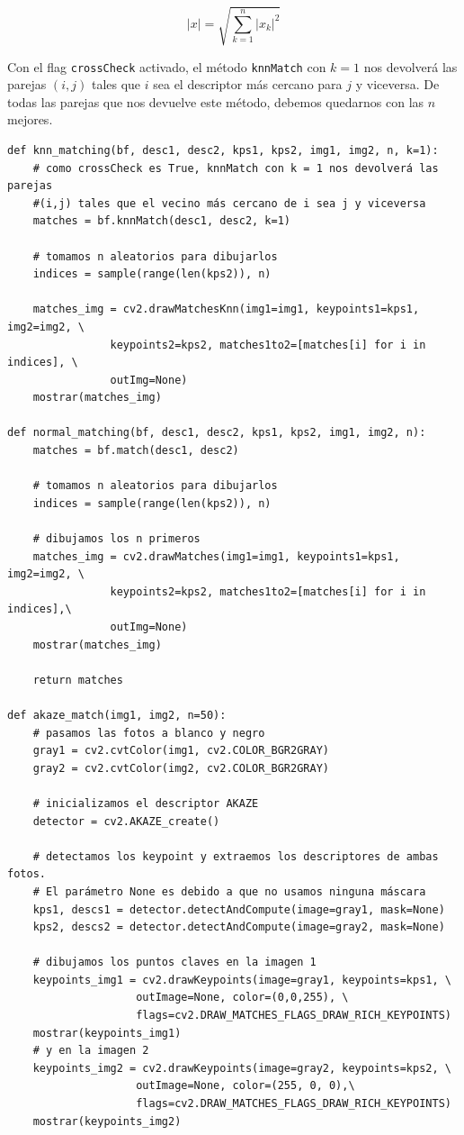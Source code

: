 \documentclass[11pt,a4paper]{article}
\theoremstyle{plain}
\theoremstyle{definition}
\begin{document}
\begin{displaymath}
 |x| = \sqrt{\sum_{k=1}^n |x_k|^2} 
\end{displaymath}

Con el flag \texttt{crossCheck} activado, el método \texttt{knnMatch} con $k=1$ nos devolverá las parejas $(i,j)$ tales que $i$ sea el descriptor más cercano para $j$ y viceversa. De todas las parejas que nos devuelve este método, debemos quedarnos con las $n$ mejores.

\begin{verbatim}
def knn_matching(bf, desc1, desc2, kps1, kps2, img1, img2, n, k=1):
    # como crossCheck es True, knnMatch con k = 1 nos devolverá las parejas 
    #(i,j) tales que el vecino más cercano de i sea j y viceversa
    matches = bf.knnMatch(desc1, desc2, k=1)

    # tomamos n aleatorios para dibujarlos
    indices = sample(range(len(kps2)), n)

    matches_img = cv2.drawMatchesKnn(img1=img1, keypoints1=kps1, img2=img2, \
                keypoints2=kps2, matches1to2=[matches[i] for i in indices], \
                outImg=None)
    mostrar(matches_img)

def normal_matching(bf, desc1, desc2, kps1, kps2, img1, img2, n):
    matches = bf.match(desc1, desc2)

    # tomamos n aleatorios para dibujarlos
    indices = sample(range(len(kps2)), n)

    # dibujamos los n primeros
    matches_img = cv2.drawMatches(img1=img1, keypoints1=kps1, img2=img2, \
                keypoints2=kps2, matches1to2=[matches[i] for i in indices],\
                outImg=None)
    mostrar(matches_img)

    return matches

def akaze_match(img1, img2, n=50):
    # pasamos las fotos a blanco y negro
    gray1 = cv2.cvtColor(img1, cv2.COLOR_BGR2GRAY)
    gray2 = cv2.cvtColor(img2, cv2.COLOR_BGR2GRAY)

    # inicializamos el descriptor AKAZE
    detector = cv2.AKAZE_create()

    # detectamos los keypoint y extraemos los descriptores de ambas fotos. 
    # El parámetro None es debido a que no usamos ninguna máscara
    kps1, descs1 = detector.detectAndCompute(image=gray1, mask=None)
    kps2, descs2 = detector.detectAndCompute(image=gray2, mask=None)

    # dibujamos los puntos claves en la imagen 1
    keypoints_img1 = cv2.drawKeypoints(image=gray1, keypoints=kps1, \
                    outImage=None, color=(0,0,255), \
                    flags=cv2.DRAW_MATCHES_FLAGS_DRAW_RICH_KEYPOINTS)
    mostrar(keypoints_img1)
    # y en la imagen 2
    keypoints_img2 = cv2.drawKeypoints(image=gray2, keypoints=kps2, \
                    outImage=None, color=(255, 0, 0),\
                    flags=cv2.DRAW_MATCHES_FLAGS_DRAW_RICH_KEYPOINTS)
    mostrar(keypoints_img2)


\end{verbatim}
\end{document}
